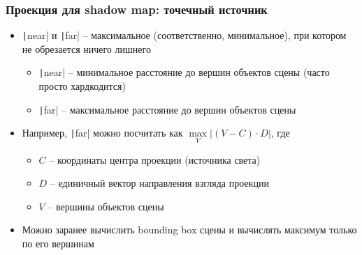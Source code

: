 \documentclass[10pt]{beamer}
\begin{document}
\begin{frame}[fragile]
\frametitle{Проекция для shadow map: точечный источник}
\begin{itemize}
\item \texttt|near| и \texttt|far| -- максимальное (соответственно, минимальное), при котором не обрезается ничего лишнего
\pause
\begin{itemize}
\item \texttt|near| -- минимальное расстояние до вершин объектов сцены (часто просто хардкодится)
\item \texttt|far| -- максимальное расстояние до вершин объектов сцены
\end{itemize}
\pause
\item Например, \texttt|far| можно посчитать как \begin{math}\max\limits_V |(V - C) \cdot D|\end{math}, где
\begin{itemize}
\item \begin{math}C\end{math} -- координаты центра проекции (источника света)
\item \begin{math}D\end{math} -- единичный вектор направления взгляда проекции
\item \begin{math}V\end{math} -- вершины объектов сцены
\end{itemize}
\pause
\item Можно заранее вычислить bounding box сцены и вычислять максимум только по его вершинам
\end{itemize}
\end{frame}
\end{document}

